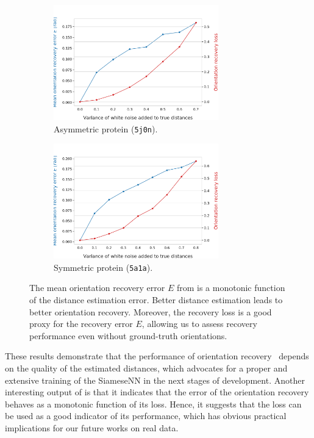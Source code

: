 \begin{figure}[ht!]
    \centering
    \begin{subfigure}[b]{0.48\textwidth}
        \includegraphics[height=5cm]{figures/5j0n_perfect_noisy_ar_aa}
        \caption{Asymmetric protein (\texttt{5j0n}).}
    \end{subfigure}
    \hfill
    \begin{subfigure}[b]{0.50\textwidth}
    \centering
        \includegraphics[height=5cm]{figures/5a1a_perfect_noisy_ar_aa}
        \caption{Symmetric protein (\texttt{5a1a}).}
    \end{subfigure}
    \caption{
        The mean orientation recovery error $E$ from  is a monotonic function of the distance estimation error.
        Better distance estimation leads to better orientation recovery.
        Moreover, the recovery loss  is a good proxy for the recovery error $E$, allowing us to assess recovery performance even without ground-truth orientations.
}
    \label{fig:perfect-with-noise-ar-aa}
\end{figure}

These results demonstrate that the performance of orientation recovery~ depends on the quality of the estimated distances, which advocates for a proper and extensive training of the SiameseNN in the next stages of development.
Another interesting output of  is that it indicates that the error of the orientation recovery behaves as a monotonic function of its loss.
Hence, it suggests that the loss can be used as a good indicator of its performance, which has obvious practical implications for our future works on real data.

